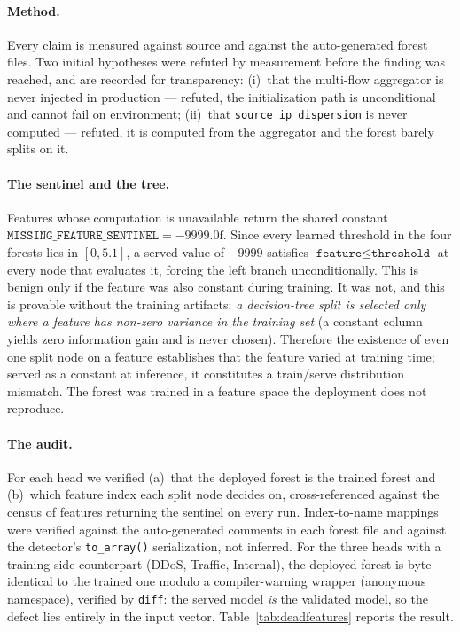 \paragraph{Method.}
Every claim is measured against source and against the auto-generated forest
files. Two initial hypotheses were refuted by measurement before the finding was
reached, and are recorded for transparency: (i)~that the multi-flow aggregator
is never injected in production --- refuted, the initialization path is
unconditional and cannot fail on environment; (ii)~that
\texttt{source\_ip\_dispersion} is never computed --- refuted, it is computed
from the aggregator and the forest barely splits on it.

\paragraph{The sentinel and the tree.}
Features whose computation is unavailable return the shared constant
$\texttt{MISSING\_FEATURE\_SENTINEL} = -9999.0\text{f}$. Since every learned
threshold in the four forests lies in $[0,5.1]$, a served value of $-9999$
satisfies $\texttt{feature} \le \texttt{threshold}$ at every node that evaluates
it, forcing the left branch unconditionally. This is benign only if the feature
was also constant during training. It was not, and this is provable without the
training artifacts: \emph{a decision-tree split is selected only where a feature
has non-zero variance in the training set} (a constant column yields zero
information gain and is never chosen). Therefore the existence of even one split
node on a feature establishes that the feature varied at training time; served
as a constant at inference, it constitutes a train/serve distribution mismatch.
The forest was trained in a feature space the deployment does not reproduce.

\paragraph{The audit.}
For each head we verified (a)~that the deployed forest is the trained forest and
(b)~which feature index each split node decides on, cross-referenced against the
census of features returning the sentinel on every run. Index-to-name mappings
were verified against the auto-generated comments in each forest file and against
the detector's \texttt{to\_array()} serialization, not inferred. For the three
heads with a training-side counterpart (DDoS, Traffic, Internal), the deployed
forest is byte-identical to the trained one modulo a compiler-warning wrapper
(anonymous namespace), verified by \texttt{diff}: the served model \emph{is} the
validated model, so the defect lies entirely in the input vector.
Table~\ref{tab:deadfeatures} reports the result.

